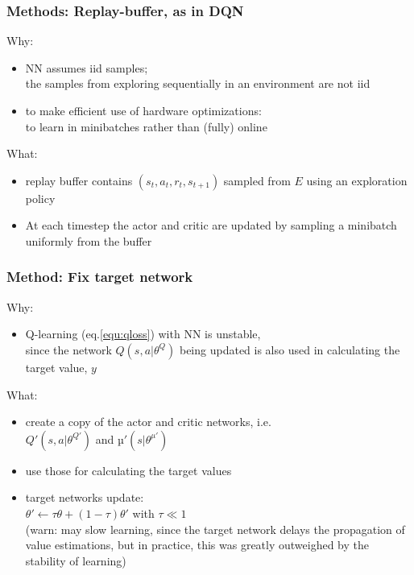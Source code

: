 \begin{frame}
\frametitle{Methods: Replay-buffer, as in DQN~\cite{Mnih2013}}
Why:
\begin{itemize}
\item NN assumes iid samples;\\
the samples from exploring sequentially in an environment are not iid
\item to make efficient use of hardware optimizations:\\
to learn in minibatches rather than (fully) online
\end{itemize}
\vspace{5mm}

What:
\begin{itemize}
  \item replay buffer contains $(s_t, a_t, r_t, s_{t+1})$ sampled from $E$ using an exploration policy
  \item At each timestep the actor and critic are updated by sampling a minibatch uniformly from the buffer
\end{itemize}

\end{frame}

\begin{frame}
\frametitle{Method: Fix target network}
Why:
\begin{itemize}
\item Q-learning (eq.\ref{equ:qloss}) with NN is unstable, \\
since the network $Q(s, a|\theta^Q)$ being updated is also used in
calculating the target value, $y$
\end{itemize}

What:
\begin{itemize}
\item create a copy of the actor and critic networks, i.e. \\
  $Q'(s, a|\theta^{Q'})$ and $µ'(s|\theta^{\mu'})$
\item use those for calculating the target values
\item target networks update: \\
    $\theta' \leftarrow \tau \theta + (1 - \tau) \theta'$ with $\tau \ll 1$\\
    (warn: may slow learning, since the target network delays the propagation of value estimations, but
    in practice, this was greatly outweighed by the stability of learning)
\end{itemize}

\end{frame}


